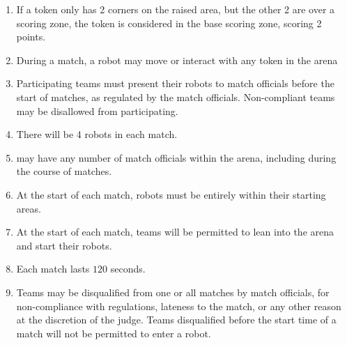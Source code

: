 \begin{enumerate}
  \item If a token only has 2 corners on the raised area, but the other 2 are over
        a scoring zone, the token is considered in the base scoring zone, scoring 2 points.
  \item During a match, a robot may move or interact with any token in the arena
  \item Participating teams must present their robots to match officials before
        the start of matches, as regulated by the match officials. Non-compliant
        teams may be disallowed from participating.
  \item There will be 4 robots in each match.
  \item \org may have any number of match officials within the arena, including
        during the course of matches.
  \item At the start of each match, robots must be entirely within their
        starting areas.
  \item At the start of each match, teams will be permitted to lean into the
        arena and start their robots.
  \item Each match lasts $120$ seconds.
  \item Teams may be disqualified from one or all matches by match officials,
        for non-compliance with regulations, lateness to the match, or any other
        reason at the discretion of the judge. Teams disqualified before the
        start time of a match will not be permitted to enter a robot.
\end{enumerate}
